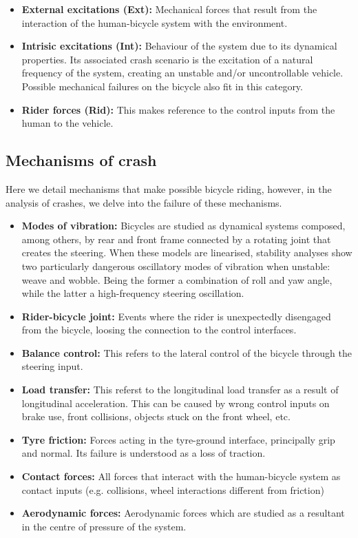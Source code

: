 \documentclass{article}
\begin{document}
\begin{itemize}
    \item \textbf{External excitations (Ext):} Mechanical forces that result from the interaction of the human-bicycle system with the environment.
    \item \textbf{Intrisic excitations (Int):} Behaviour of the system due to its dynamical properties.
        Its associated crash scenario is the excitation of a natural frequency of the system, creating an unstable and/or uncontrollable vehicle.
        Possible mechanical failures on the bicycle also fit in this category.
    \item \textbf{Rider forces (Rid):} This makes reference to the control inputs from the human to the vehicle.
\end{itemize}



\subsection{Mechanisms of crash}

Here we detail mechanisms that make possible bicycle riding, however, in the analysis of crashes, we delve into the failure of these mechanisms.

\begin{itemize}
    \item \textbf{Modes of vibration:} Bicycles are studied as dynamical systems composed, among others, by rear and front frame connected by a rotating joint that creates the steering.
        When these models are linearised, stability analyses show two particularly dangerous oscillatory modes of vibration when unstable: weave and wobble.
        Being the former a combination of roll and yaw angle, while the latter a high-frequency steering oscillation.
    \item \textbf{Rider-bicycle joint:} Events where the rider is unexpectedly disengaged from the bicycle, loosing the connection to the control interfaces.
    \item \textbf{Balance control:} This refers to the lateral control of the bicycle through the steering input.
    \item \textbf{Load transfer:} This referst to the longitudinal load transfer as a result of longitudinal acceleration.
        This can be caused by wrong control inputs on brake use, front collisions, objects stuck on the front wheel, etc.
    \item \textbf{Tyre friction:} Forces acting in the tyre-ground interface, principally grip and normal.
        Its failure is understood as a loss of traction.
    \item \textbf{Contact forces:} All forces that interact with the human-bicycle system as contact inputs (e.g. collisions, wheel interactions different from friction)
    \item \textbf{Aerodynamic forces:} Aerodynamic forces which are studied as a resultant in the centre of pressure of the system.
\end{itemize}
\end{document}
